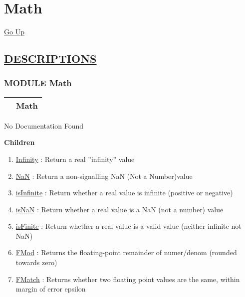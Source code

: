 \chapter*{\color{headfile}
Math
}
\hypertarget{ecldoc:toc:Math}{}
\hyperlink{ecldoc:toc:root}{Go Up}


\section*{\underline{\textsf{DESCRIPTIONS}}}
\subsection*{\textsf{\colorbox{headtoc}{\color{white} MODULE}
Math}}

\hypertarget{ecldoc:Math}{}

{\renewcommand{\arraystretch}{1.5}
\begin{tabularx}{\textwidth}{|>{\raggedright\arraybackslash}l|X|}
\hline
\hspace{0pt}\mytexttt{\color{red} } & \textbf{Math} \\
\hline
\end{tabularx}
}

\par





No Documentation Found







\textbf{Children}
\begin{enumerate}
\item \hyperlink{ecldoc:math.infinity}{Infinity}
: Return a real ''infinity'' value
\item \hyperlink{ecldoc:math.nan}{NaN}
: Return a non-signalling NaN (Not a Number)value
\item \hyperlink{ecldoc:math.isinfinite}{isInfinite}
: Return whether a real value is infinite (positive or negative)
\item \hyperlink{ecldoc:math.isnan}{isNaN}
: Return whether a real value is a NaN (not a number) value
\item \hyperlink{ecldoc:math.isfinite}{isFinite}
: Return whether a real value is a valid value (neither infinite not NaN)
\item \hyperlink{ecldoc:math.fmod}{FMod}
: Returns the floating-point remainder of numer/denom (rounded towards zero)
\item \hyperlink{ecldoc:math.fmatch}{FMatch}
: Returns whether two floating point values are the same, within margin of error epsilon
\end{enumerate}

